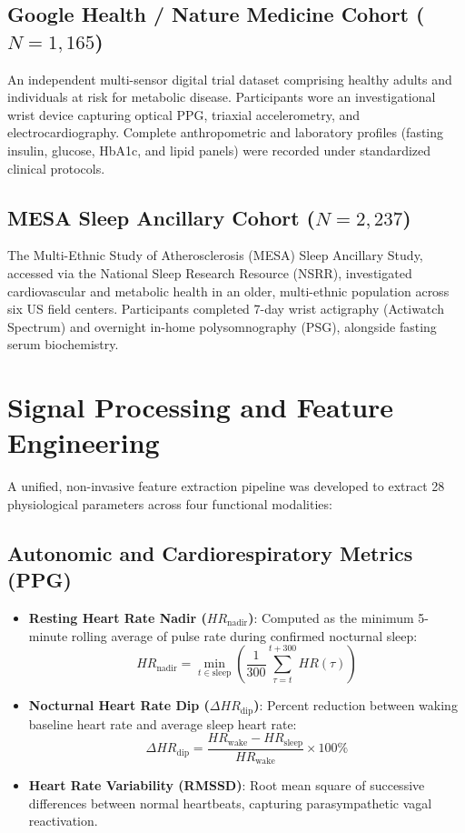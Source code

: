 \documentclass[12pt,a4paper,oneside]{report}
\begin{document}
\subsection{Google Health / Nature Medicine Cohort ($N = 1,165$)}
An independent multi-sensor digital trial dataset comprising healthy adults and individuals at risk for metabolic disease. Participants wore an investigational wrist device capturing optical PPG, triaxial accelerometry, and electrocardiography. Complete anthropometric and laboratory profiles (fasting insulin, glucose, HbA1c, and lipid panels) were recorded under standardized clinical protocols.

\subsection{MESA Sleep Ancillary Cohort ($N = 2,237$)}
The Multi-Ethnic Study of Atherosclerosis (MESA) Sleep Ancillary Study, accessed via the National Sleep Research Resource (NSRR), investigated cardiovascular and metabolic health in an older, multi-ethnic population across six US field centers. Participants completed 7-day wrist actigraphy (Actiwatch Spectrum) and overnight in-home polysomnography (PSG), alongside fasting serum biochemistry.

\section{Signal Processing and Feature Engineering}
A unified, non-invasive feature extraction pipeline was developed to extract 28 physiological parameters across four functional modalities:

\subsection{Autonomic and Cardiorespiratory Metrics (PPG)}
\begin{itemize}
    \item \textbf{Resting Heart Rate Nadir ($HR_{\text{nadir}}$)}: Computed as the minimum 5-minute rolling average of pulse rate during confirmed nocturnal sleep:
    \begin{equation}
    HR_{\text{nadir}} = \min_{t \in \text{sleep}} \left( \frac{1}{300} \sum_{\tau=t}^{t+300} HR(\tau) \right)
    \end{equation}
    \item \textbf{Nocturnal Heart Rate Dip ($\Delta HR_{\text{dip}}$)}: Percent reduction between waking baseline heart rate and average sleep heart rate:
    \begin{equation}
    \Delta HR_{\text{dip}} = \frac{HR_{\text{wake}} - HR_{\text{sleep}}}{HR_{\text{wake}}} \times 100\%
    \end{equation}
    \item \textbf{Heart Rate Variability (RMSSD)}: Root mean square of successive differences between normal heartbeats, capturing parasympathetic vagal reactivation.
\end{itemize}
\end{document}
